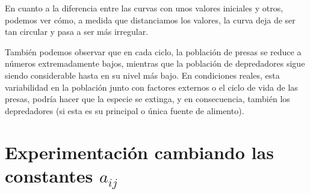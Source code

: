 \documentclass[11pt,a4paper]{article}
\begin{document}
En cuanto a la diferencia entre las curvas con unos valores iniciales y otros, podemos ver cómo, a medida que distanciamos los valores, la
curva deja de ser tan circular y pasa a ser más irregular.

También podemos observar que en cada ciclo, la población de presas se reduce a números extremadamente bajos, mientras que la población de
depredadores sigue siendo considerable hasta en su nivel más bajo. En condiciones reales, esta variabilidad en la población junto con factores
externos o el ciclo de vida de las presas, podría hacer que la especie se extinga, y en consecuencia, también los depredadores (si esta es
su principal o única fuente de alimento).



\section{Experimentación cambiando las constantes $a_{ij}$}
\end{document}
